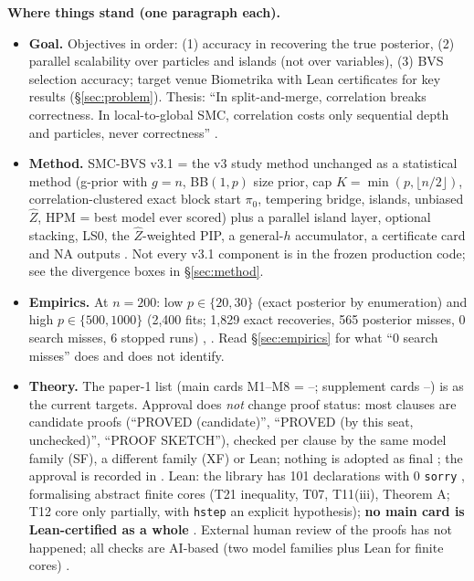 \textbf{Where things stand (one paragraph each).}
\begin{itemize}
\item \textbf{Goal.} Objectives in order: (1) accuracy in recovering the true posterior, (2) parallel scalability over particles and islands (not over variables), (3) BVS selection accuracy; target venue Biometrika with Lean certificates for key results (\S\ref{sec:problem}). Thesis: ``In split-and-merge, correlation breaks correctness. In local-to-global SMC, correlation costs only sequential depth and particles, never correctness'' .
\item \textbf{Method.} SMC-BVS v3.1 = the v3 study method unchanged as a statistical method (g-prior with $g=n$, BB$(1,p)$ size prior, cap $K=\min(p,\lfloor n/2\rfloor)$, correlation-clustered exact block start $\pi_0$, tempering bridge, islands, unbiased $\hat Z$, HPM = best model ever scored) plus a parallel island layer, optional stacking, LS0, the $\hat Z$-weighted PIP, a general-$h$ accumulator, a certificate card and NA outputs . Not every v3.1 component is in the frozen production code; see the divergence boxes in \S\ref{sec:method}.
\item \textbf{Empirics.} At $n=200$: low $p\in\{20,30\}$ (exact posterior by enumeration) and high $p\in\{500,1000\}$ (2,400 fits; 1,829 exact recoveries, 565 posterior misses, 0 search misses, 6 stopped runs) , . Read \S\ref{sec:empirics} for what ``0 search misses'' does and does not identify.
\item \textbf{Theory.} The paper-1 list (main cards M1--M8 = --; supplement cards --) is \approvedFB{} as the current targets. Approval does \emph{not} change proof status: most clauses are candidate proofs (``PROVED (candidate)'', ``PROVED (by this seat, unchecked)'', ``PROOF SKETCH''), checked per clause by the same model family (SF), a different family (XF) or Lean; nothing is adopted as final ; the approval is recorded in . Lean: the library has 101 declarations with 0 \texttt{sorry} , formalising abstract finite cores (T21 inequality, T07, T11(iii), Theorem A; T12 core only partially, with \texttt{hstep} an explicit hypothesis); \textbf{no main card is Lean-certified as a whole} . External human review of the proofs has not happened; all checks are AI-based (two model families plus Lean for finite cores) .

\end{itemize}
